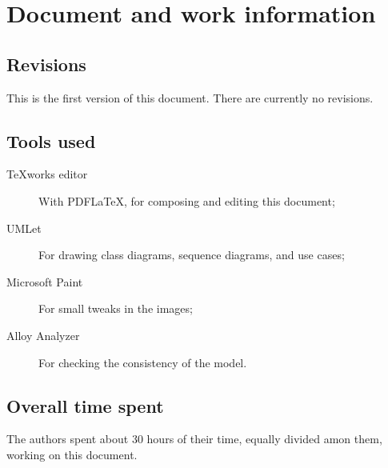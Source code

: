 \chapter{Document and work information}

\section{Revisions}
This is the first version of this document. There are currently no revisions.

\section{Tools used}
\begin{description}
\item[TeXworks editor] With PDF\LaTeX{}, for composing and editing this document;
\item[UMLet] For drawing class diagrams, sequence diagrams, and use cases;
\item[Microsoft Paint] For small tweaks in the images;
\item[Alloy Analyzer] For checking the consistency of the model.
\end{description}

\section{Overall time spent}
The authors spent about 30 hours of their time, equally divided amon them, working on this document.